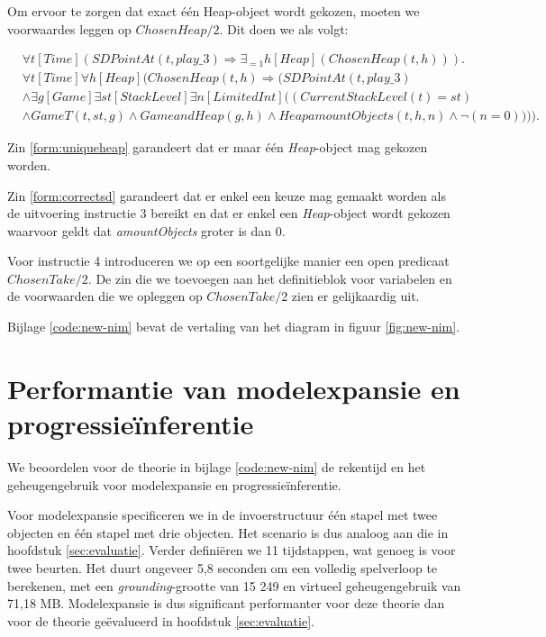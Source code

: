 Om ervoor te zorgen dat exact \'e\'en Heap-object wordt gekozen, moeten we voorwaardes leggen op $ChosenHeap/2$. Dit doen we als volgt:

\begin{align}
&\forall{t}[Time](SDPointAt(t, play\_3) \Rightarrow \exists_{=1}{h}[Heap](ChosenHeap(t, h))).\label{form:uniqueheap} \\
\nonumber &\forall{t}[Time]\forall{h}[Heap](ChosenHeap(t, h) \Rightarrow (SDPointAt(t, play\_3) \\ \nonumber &\land \exists{g}[Game]\exists{st}[StackLevel]\exists{n}[LimitedInt]((CurrentStackLevel(t) = st) \\ &\land GameT(t, st, g) \land GameandHeap(g, h) \land HeapamountObjects(t, h, n) \land \lnot(n = 0)))).\label{form:correctsd}
\end{align}

Zin \ref{form:uniqueheap} garandeert dat er maar \'e\'en \textit{Heap}-object mag gekozen worden.

Zin \ref{form:correctsd} garandeert dat er enkel een keuze mag gemaakt worden als de uitvoering instructie 3 bereikt en dat er enkel een \textit{Heap}-object wordt gekozen waarvoor geldt dat \textit{amountObjects} groter is dan 0.

Voor instructie 4 introduceren we op een soortgelijke manier een open predicaat $ChosenTake/2$. De zin die we toevoegen aan het definitieblok voor variabelen en de voorwaarden die we opleggen op $ChosenTake/2$ zien er gelijkaardig uit.

Bijlage \ref{code:new-nim} bevat de vertaling van het diagram in figuur \ref{fig:new-nim}.

\section{Performantie van modelexpansie en progressie\"inferentie}\label{sec:dec-performance}

We beoordelen voor de theorie in bijlage \ref{code:new-nim} de rekentijd en het geheugengebruik voor modelexpansie en progressie\"inferentie.

Voor modelexpansie specificeren we in de invoerstructuur \'e\'en stapel met twee objecten en \'e\'en stapel met drie objecten. Het scenario is dus analoog aan die in hoofdstuk \ref{sec:evaluatie}. Verder defini\"eren we 11 tijdstappen, wat genoeg is voor twee beurten. Het duurt ongeveer 5,8 seconden om een volledig spelverloop te berekenen, met een \textit{grounding}-grootte van 15 249 en virtueel geheugengebruik van 71,18 MB. Modelexpansie is dus significant performanter voor deze theorie dan voor de theorie ge\"evalueerd in hoofdstuk \ref{sec:evaluatie}.

